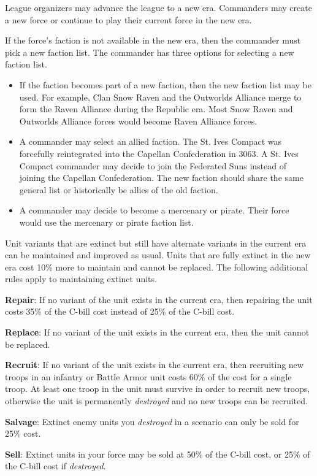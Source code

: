 League organizers may advance the league to a new era.
Commanders may create a new force or continue to play their current force in the new era.

If the force's faction is not available in the new era, then the commander must pick a new faction list.
The commander has three options for selecting a new faction list.

\begin{itemize}

\item If the faction becomes part of a new faction, then the new faction list may be used.
For example, Clan Snow Raven and the Outworlds Alliance merge to form the Raven Alliance during the Republic era.
Most Snow Raven and Outworlds Alliance forces would become Raven Alliance forces.

\item A commander may select an allied faction.
The St. Ives Compact was forcefully reintegrated into the Capellan Confederation in 3063.
A St. Ives Compact commander may decide to join the Federated Suns instead of joining the Capellan Confederation.
The new faction should share the same general list or historically be allies of the old faction.

\item A commander may decide to become a mercenary or pirate.
Their force would use the mercenary or pirate faction list.

\end{itemize}

Unit variants that are extinct but still have alternate variants in the current era can be maintained and improved as usual.
Units that are fully extinct in the new era cost 10\% more to maintain and cannot be replaced.
The following additional rules apply to maintaining extinct units.

\begin{description}

\item {\bfseries Repair}: If no variant of the unit exists in the current era, then repairing the unit costs 35\% of the C-bill cost instead of 25\% of the C-bill cost.

\item {\bfseries Replace}: If no variant of the unit exists in the current era, then the unit cannot be replaced.

\item {\bfseries Recruit}: If no variant of the unit exists in the current era, then recruiting new troops in an infantry or Battle Armor unit costs 60\% of the cost for a single troop.
At least one troop in the unit must survive in order to recruit new troops, otherwise the unit is permanently \emph{destroyed} and no new troops can be recruited.

\item {\bfseries Salvage}: Extinct enemy units you \emph{destroyed} in a scenario can only be sold for 25\% cost.

\item {\bfseries Sell}: Extinct units in your force may be sold at 50\% of the C-bill cost, or 25\% of the C-bill cost if \emph{destroyed}.

\end{description}
